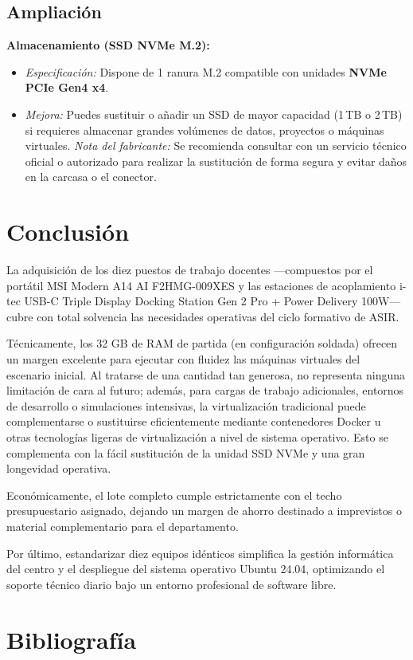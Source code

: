 \documentclass[11.5pt]{article}
\begin{document}
	\subsection{Ampliación}
	\textbf{Almacenamiento (SSD NVMe M.2):}
	\begin{itemize}
		\item \textit{Especificación:} Dispone de 1 ranura M.2 compatible con unidades \textbf{NVMe PCIe Gen4 x4}.
		\item \textit{Mejora:} Puedes sustituir o añadir un SSD de mayor capacidad (1\,TB o 2\,TB) si requieres almacenar grandes volúmenes de datos, proyectos o máquinas virtuales. \textit{Nota del fabricante:} Se recomienda consultar con un servicio técnico oficial o autorizado para realizar la sustitución de forma segura y evitar daños en la carcasa o el conector.
	\end{itemize}
	\section{Conclusión}
	
	La adquisición de los diez puestos de trabajo docentes —compuestos por el portátil MSI Modern A14 AI F2HMG-009XES y las estaciones de acoplamiento i-tec USB-C Triple Display Docking Station Gen 2 Pro + Power Delivery 100W— cubre con total solvencia las necesidades operativas del ciclo formativo de ASIR.
	
	Técnicamente, los 32 GB de RAM de partida (en configuración soldada) ofrecen un margen excelente para ejecutar con fluidez las máquinas virtuales del escenario inicial. Al tratarse de una cantidad tan generosa, no representa ninguna limitación de cara al futuro; además, para cargas de trabajo adicionales, entornos de desarrollo o simulaciones intensivas, la virtualización tradicional puede complementarse o sustituirse eficientemente mediante contenedores Docker u otras tecnologías ligeras de virtualización a nivel de sistema operativo. Esto se complementa con la fácil sustitución de la unidad SSD NVMe y una gran longevidad operativa.
	
	Económicamente, el lote completo cumple estrictamente con el techo presupuestario asignado, dejando un margen de ahorro destinado a imprevistos o material complementario para el departamento.
	
	Por último, estandarizar diez equipos idénticos simplifica la gestión informática del centro y el despliegue del sistema operativo Ubuntu 24.04, optimizando el soporte técnico diario bajo un entorno profesional de software libre.
	
	\section{Bibliografía}
	
	\printbibliography[heading=none]
	
\end{document}

